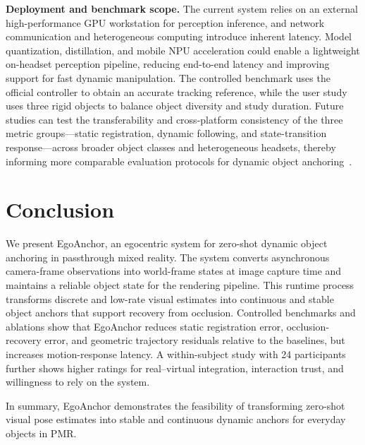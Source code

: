 \documentclass[review]{vgtc}
\begin{document}
\textbf{Deployment and benchmark scope.}
The current system relies on an external high-performance GPU workstation for perception inference, and network communication and heterogeneous computing introduce inherent latency. Model quantization, distillation, and mobile NPU acceleration could enable a lightweight on-headset perception pipeline, reducing end-to-end latency and improving support for fast dynamic manipulation. The controlled benchmark uses the official controller to obtain an accurate tracking reference, while the user study uses three rigid objects to balance object diversity and study duration. Future studies can test the transferability and cross-platform consistency of the three metric groups---static registration, dynamic following, and state-transition response---across broader object classes and heterogeneous headsets, thereby informing more comparable evaluation protocols for dynamic object anchoring~\cite{cheng2024tracking,hu2024applemeta,hu2025xrrealitycheck}.

\section{Conclusion}\label{sec:conclusion}

We present EgoAnchor, an egocentric system for zero-shot dynamic object anchoring in passthrough mixed reality. The system converts asynchronous camera-frame observations into world-frame states at image capture time and maintains a reliable object state for the rendering pipeline. This runtime process transforms discrete and low-rate visual estimates into continuous and stable object anchors that support recovery from occlusion. Controlled benchmarks and ablations show that EgoAnchor reduces static registration error, occlusion-recovery error, and geometric trajectory residuals relative to the baselines, but increases motion-response latency. A within-subject study with 24 participants further shows higher ratings for real--virtual integration, interaction trust, and willingness to rely on the system.

In summary, EgoAnchor demonstrates the feasibility of transforming zero-shot visual pose estimates into stable and continuous dynamic anchors for everyday objects in PMR.




\end{document}
